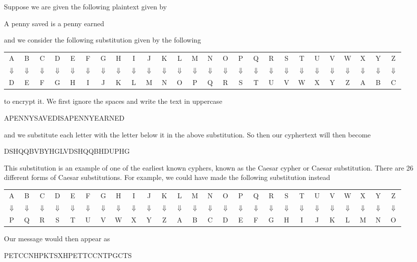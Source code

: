 \documentclass[11pt]{amsart}
\theoremstyle{definition}\newtheorem{definition}{Definition}
\theoremstyle{definition}\newtheorem{example}{Example}
\begin{document}
Suppose we are given the following plaintext given by
\begin{center}
    A penny saved is a penny earned
\end{center}
and we consider the following substitution given by the following
\begin{center}
    \begin{tabular}{cccccccccccccccccccccccccc}
        A & B & C & D & E & F & G & H & I & J & K & L & M & N & O & P & Q & R & S & T & U & V & W & X & Y & Z \\
        $\Downarrow$ & $\Downarrow$ & $\Downarrow$ & $\Downarrow$ & $\Downarrow$ & $\Downarrow$ & $\Downarrow$ & $\Downarrow$ & $\Downarrow$ & $\Downarrow$ & $\Downarrow$ & $\Downarrow$ & $\Downarrow$ & $\Downarrow$ & $\Downarrow$ & $\Downarrow$ & $\Downarrow$ & $\Downarrow$ & $\Downarrow$ & $\Downarrow$ & $\Downarrow$ & $\Downarrow$ & $\Downarrow$ & $\Downarrow$ & $\Downarrow$ & $\Downarrow$ \\
        D & E & F & G & H & I & J & K & L & M & N & O & P & Q & R & S & T & U & V & W & X & Y & Z & A & B & C
    \end{tabular}
\end{center}
to encrypt it. We first ignore the spaces and write the text in uppercase
\begin{center}
    APENNYSAVEDISAPENNYEARNED
\end{center}
and we substitute each letter with the letter below it in the above substitution. So then our cyphertext will then become
\begin{center}
    DSHQQBVBYHGLVDSHQQBHDUPHG
\end{center}
This substitution is an example of one of the earliest known cyphers, known as the Caesar cypher or Caesar substitution. There are 26 different forms of Caesar substitutions. For example, we could have made the following substitution instead
\begin{center}
    \begin{tabular}{cccccccccccccccccccccccccc}
        A & B & C & D & E & F & G & H & I & J & K & L & M & N & O & P & Q & R & S & T & U & V & W & X & Y & Z \\
        $\Downarrow$ & $\Downarrow$ & $\Downarrow$ & $\Downarrow$ & $\Downarrow$ & $\Downarrow$ & $\Downarrow$ & $\Downarrow$ & $\Downarrow$ & $\Downarrow$ & $\Downarrow$ & $\Downarrow$ & $\Downarrow$ & $\Downarrow$ & $\Downarrow$ & $\Downarrow$ & $\Downarrow$ & $\Downarrow$ & $\Downarrow$ & $\Downarrow$ & $\Downarrow$ & $\Downarrow$ & $\Downarrow$ & $\Downarrow$ & $\Downarrow$ & $\Downarrow$ \\
        P & Q & R & S & T & U & V & W & X & Y & Z & A & B & C & D & E & F & G & H & I & J & K & L & M & N & O
    \end{tabular}
\end{center}
Our message would then appear as
\begin{center}
    PETCCNHPKTSXHPETTCCNTPGCTS
\end{center}
\end{document}
